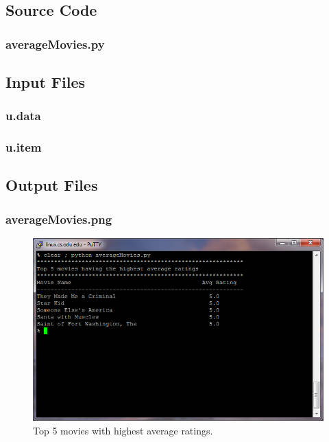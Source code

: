 \documentclass[12pt]{article}
\begin{document}
\newpage
\subsection{Source Code}
\subsubsection{averageMovies.py}

\newpage

\subsection{Input Files}
\subsubsection{u.data}

\subsubsection{u.item}


\newpage
\subsection{Output Files}
\subsubsection{averageMovies.png}
\begin{figure}[ht]
\includegraphics[scale=1.0]{../Q1/averageMovies}
\centering
\caption{Top 5 movies with highest average ratings.}
\label{fig:averageMovies}
\end{figure}
\newpage
\end{document}
